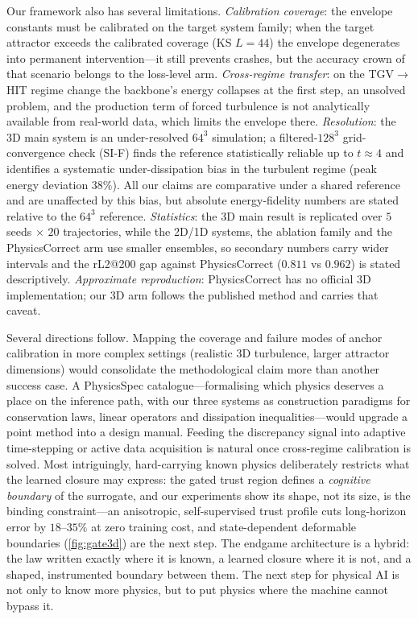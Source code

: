 \documentclass[11pt,a4paper]{article}
\begin{document}
Our framework also has several limitations. \emph{Calibration coverage}: the envelope constants must be calibrated on the target system family; when the target attractor exceeds the calibrated coverage (KS $L{=}44$) the envelope degenerates into permanent intervention---it still prevents crashes, but the accuracy crown of that scenario belongs to the loss-level arm. \emph{Cross-regime transfer}: on the TGV$\to$HIT regime change the backbone's energy collapses at the first step, an unsolved problem, and the production term of forced turbulence is not analytically available from real-world data, which limits the envelope there. \emph{Resolution}: the 3D main system is an under-resolved $64^3$ simulation; a filtered-$128^3$ grid-convergence check (SI-F) finds the reference statistically reliable up to $t{\approx}4$ and identifies a systematic under-dissipation bias in the turbulent regime (peak energy deviation $38\%$). All our claims are comparative under a shared reference and are unaffected by this bias, but absolute energy-fidelity numbers are stated relative to the $64^3$ reference. \emph{Statistics}: the 3D main result is replicated over $5$ seeds $\times$ $20$ trajectories, while the 2D/1D systems, the ablation family and the PhysicsCorrect arm use smaller ensembles, so secondary numbers carry wider intervals and the rL2@200 gap against PhysicsCorrect ($0.811$ vs $0.962$) is stated descriptively. \emph{Approximate reproduction}: PhysicsCorrect has no official 3D implementation; our 3D arm follows the published method and carries that caveat.

Several directions follow. Mapping the coverage and failure modes of anchor calibration in more complex settings (realistic 3D turbulence, larger attractor dimensions) would consolidate the methodological claim more than another success case. A PhysicsSpec catalogue---formalising which physics deserves a place on the inference path, with our three systems as construction paradigms for conservation laws, linear operators and dissipation inequalities---would upgrade a point method into a design manual. Feeding the discrepancy signal into adaptive time-stepping or active data acquisition is natural once cross-regime calibration is solved. Most intriguingly, hard-carrying known physics deliberately restricts what the learned closure may express: the gated trust region defines a \emph{cognitive boundary} of the surrogate, and our experiments show its shape, not its size, is the binding constraint---an anisotropic, self-supervised trust profile cuts long-horizon error by $18$--$35\%$ at zero training cost, and state-dependent deformable boundaries (\ref{fig:gate3d}) are the next step. The endgame architecture is a hybrid: the law written exactly where it is known, a learned closure where it is not, and a shaped, instrumented boundary between them. The next step for physical AI is not only to know more physics, but to put physics where the machine cannot bypass it.
\end{document}
